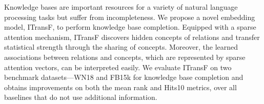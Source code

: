 Knowledge bases are important resources for a variety of natural language processing tasks but suffer from incompleteness. We propose a novel embedding model, ITransF, to perform knowledge base completion. Equipped with a sparse attention mechanism, ITransF discovers hidden concepts of relations and transfer statistical strength through the sharing of concepts. Moreover, the learned associations between relations and concepts, which are represented by sparse attention vectors, can be interpreted easily. We evaluate ITransF on two benchmark datasets---WN18 and FB15k for knowledge base completion and obtains improvements on both the mean rank and Hits\@10 metrics, over all baselines that do not use additional information.

